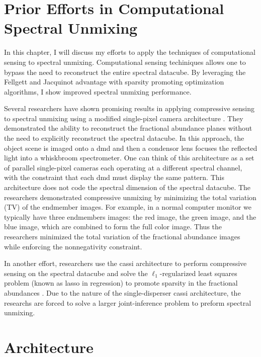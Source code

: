 \section{Prior Efforts in Computational Spectral Unmixing}

In this chapter, I will discuss my efforts to apply the techniques of computational sensing to spectral unmixing. Computational sensing techiniques allows one to bypass the need to reconstruct the entire spectral datacube. By leveraging the Fellgett and Jacquinot advantage with sparsity promoting optimization algorithms, I show improved spectral unmixing performance. 


Several researchers have shown promising results in applying compressive sensing to spectral unmixing using a modified single-pixel camera architecture \cite{li2012compressive}. They demonstrated the ability to reconstruct the fractional abundance planes without the need to explicitly reconstruct the spectral datacube. In this approach, the object scene is imaged onto a \gls{dmd} and then a condensor lens focuses the reflected light into a whiskbroom spectrometer. One can think of this architecture as a set of parallel single-pixel cameras each operating at a different spectral channel, with the constraint that each \gls{dmd} must display the same pattern. This architecture does not code the spectral dimension of the spectral datacube. The researchers demonstrated compressive unmixing by minimizing the total variation (TV) of the endmember images. For example, in a normal computer monitor we typically have three endmembers images: the red image, the green image, and the blue image, which are combined to form the full color image. Thus the researchers minimized the total variation of the fractional abundance images while enforcing the nonnegativity constraint. 

In another effort, researchers use the \acrfull{cassi} architecture to perform compressive sensing on the spectral datacube and solve the $\ell_1$-regularized least squares problem (known as lasso in regression) to promote sparsity in the fractional abundances \cite{monsalve2015spectral}. Due to the nature of the single-disperser \gls{cassi} architecture, the researchs are forced to solve a larger joint-inference problem to preform spectral unmixing. 


\section{Architecture}

